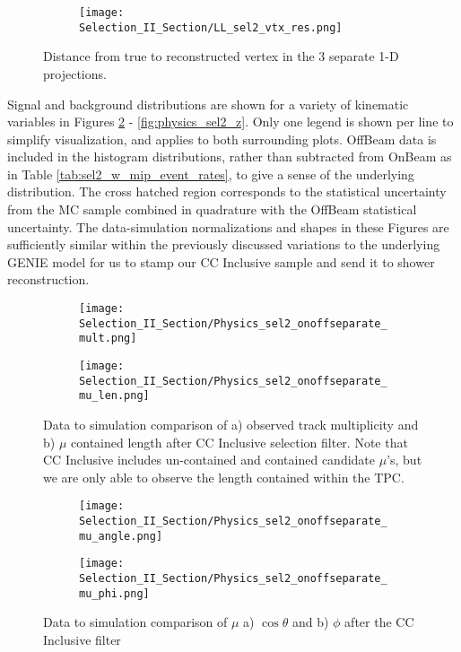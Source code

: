 \begin{figure}[H]
\centering
 \begin{subfigure}[t]{0.8\textwidth}
    \centering
\texttt{[image: Selection\_II\_Section/LL\_sel2\_vtx\_res.png]}
    \caption{ }
  \end{subfigure} 
\caption{Distance from true to reconstructed vertex in the 3 separate 1-D projections. }
\label{fig:physics_sel2_vtxres}
\end{figure}

\par Signal and background distributions are shown for a variety of kinematic variables in Figures \ref{fig:physics_sel2_mulen} - \ref{fig:physics_sel2_z}. Only one legend is shown per line to simplify visualization, and applies to both surrounding plots.  OffBeam data is included in the histogram distributions, rather than subtracted from OnBeam as in Table \ref{tab:sel2_w_mip_event_rates}, to give a sense of the underlying distribution.  The cross hatched region corresponds to the statistical uncertainty from the MC sample combined in quadrature with the OffBeam statistical uncertainty.  The data-simulation normalizations and shapes in these Figures are sufficiently similar within the previously discussed variations to the underlying GENIE model for us to stamp our CC Inclusive sample and send it to shower reconstruction.

\begin{figure}[h!]
  \begin{subfigure}[t]{0.3\textwidth}
\texttt{[image: Selection\_II\_Section/Physics\_sel2\_onoffseparate\_mult.png]}
    \caption{ }
  \end{subfigure} 
  \hspace{34 mm}
  \begin{subfigure}[t]{0.3\textwidth}
\texttt{[image: Selection\_II\_Section/Physics\_sel2\_onoffseparate\_mu\_len.png]}
    \caption{ }
  \end{subfigure} 
 
\caption{ Data to simulation comparison of a) observed track multiplicity and b) $\mu$ contained length after CC Inclusive selection filter.  Note that CC Inclusive includes un-contained and contained candidate $\mu$'s, but we are only able to observe the length contained within the TPC.  }
\label{fig:physics_sel2_mulen}
\end{figure}

\begin{figure}[h!]
  \begin{subfigure}[t]{0.3\textwidth}
\texttt{[image: Selection\_II\_Section/Physics\_sel2\_onoffseparate\_mu\_angle.png]}
   \caption{ }
  \end{subfigure} 
  \hspace{34 mm}
  \begin{subfigure}[t]{0.3\textwidth}
    \texttt{[image: Selection\_II\_Section/Physics\_sel2\_onoffseparate\_mu\_phi.png]}
  \caption{ }
  \end{subfigure} 
\caption{ Data to simulation comparison of $\mu$ a) $\cos\theta$  and b) $\phi$ after the CC Inclusive filter }
\label{fig:physics_sel2_muphi}
\end{figure}

